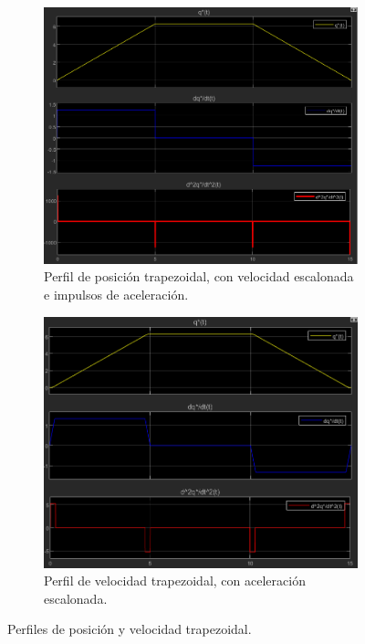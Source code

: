 \documentclass{article}
\begin{document}
\begin{figure}[H]
    \centering
    \begin{subfigure}[b]{0.45\textwidth}
        \centering
        \includegraphics[width=\textwidth]{Imagenes/PosicionTrapezoidal.png}
        \caption{Perfil de posición trapezoidal, con velocidad escalonada e impulsos de aceleración.}
        \label{fig:PosicionTrapezoidal}
    \end{subfigure}
    \hfill
    \begin{subfigure}[b]{0.45\textwidth}
        \centering
        \includegraphics[width=\textwidth]{Imagenes/VelocidadTrapezoidal.png}
        \caption{Perfil de velocidad trapezoidal, con aceleración escalonada.}
        \label{fig:VelocidadTrapezoidal}
    \end{subfigure}
    \caption{Perfiles de posición y velocidad trapezoidal.}
\end{figure}
\end{document}
